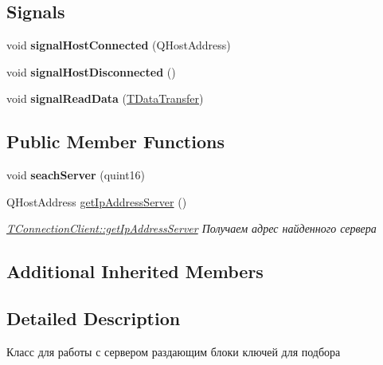 \subsection*{Signals}
\begin{DoxyCompactItemize}
\item 
\mbox{\label{classconnection_1_1_t_connection_client_ac212179323260ec43c92cbf723862de4}} 
void {\bfseries signal\+Host\+Connected} (Q\+Host\+Address)
\item 
\mbox{\label{classconnection_1_1_t_connection_client_a7f4d3365c0a3a0322328b08cdfb65505}} 
void {\bfseries signal\+Host\+Disconnected} ()
\item 
\mbox{\label{classconnection_1_1_t_connection_client_ae8e70aba5cf1ee1cd00248faf2268f1d}} 
void {\bfseries signal\+Read\+Data} (\hyperlink{structconnection_1_1_t_data_transfer}{T\+Data\+Transfer})
\end{DoxyCompactItemize}
\subsection*{Public Member Functions}
\begin{DoxyCompactItemize}
\item 
\mbox{\label{classconnection_1_1_t_connection_client_ad2074cdebc8cc41b0fe9227c032f6623}} 
void {\bfseries seach\+Server} (quint16)
\item 
Q\+Host\+Address \hyperlink{classconnection_1_1_t_connection_client_afa458e30889d97faa2f1f8d9ee41e97e}{get\+Ip\+Address\+Server} ()
\begin{DoxyCompactList}\small\item\em \hyperlink{classconnection_1_1_t_connection_client_afa458e30889d97faa2f1f8d9ee41e97e}{T\+Connection\+Client\+::get\+Ip\+Address\+Server} Получаем адрес найденного сервера \end{DoxyCompactList}\end{DoxyCompactItemize}
\subsection*{Additional Inherited Members}


\subsection{Detailed Description}
Класс для работы с сервером раздающим блоки ключей для подбора 

